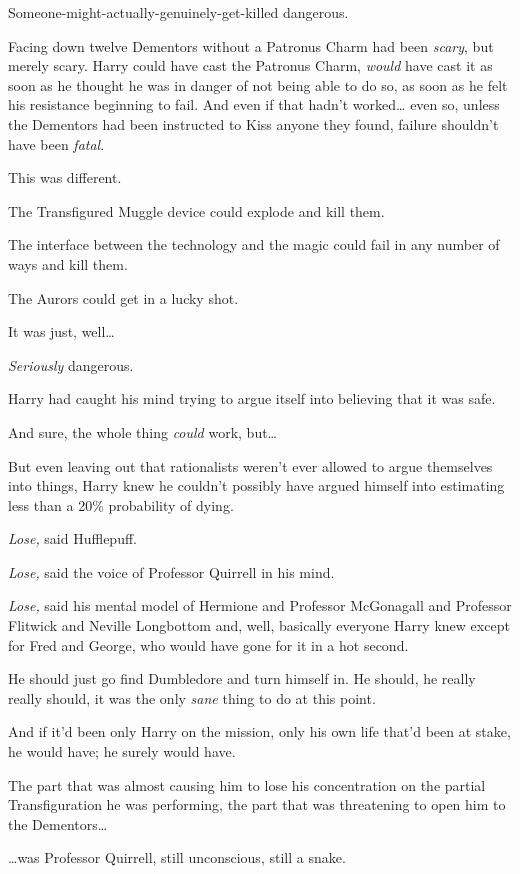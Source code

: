 Someone-might-actually-genuinely-get-killed dangerous.

Facing down twelve Dementors without a Patronus Charm had been \emph{scary}, but merely scary. Harry could have cast the Patronus Charm, \emph{would} have cast it as soon as he thought he was in danger of not being able to do so, as soon as he felt his resistance beginning to fail. And even if that hadn't worked{\ldots} even so, unless the Dementors had been instructed to Kiss anyone they found, failure shouldn't have been \emph{fatal}.

This was different.

The Transfigured Muggle device could explode and kill them.

The interface between the technology and the magic could fail in any number of ways and kill them.

The Aurors could get in a lucky shot.

It was just, well{\ldots}

\emph{Seriously} dangerous.

Harry had caught his mind trying to argue itself into believing that it was safe.

And sure, the whole thing \emph{could} work, but{\ldots}

But even leaving out that rationalists weren't ever allowed to argue themselves into things, Harry knew he couldn't possibly have argued himself into estimating less than a 20\% probability of dying.

\emph{Lose,} said Hufflepuff.

\emph{Lose,} said the voice of Professor Quirrell in his mind.

\emph{Lose,} said his mental model of Hermione and Professor McGonagall and Professor Flitwick and Neville Longbottom and, well, basically everyone Harry knew except for Fred and George, who would have gone for it in a hot second.

He should just go find Dumbledore and turn himself in. He should, he really really should, it was the only \emph{sane} thing to do at this point.

And if it'd been only Harry on the mission, only his own life that'd been at stake, he would have; he surely would have.

The part that was almost causing him to lose his concentration on the partial Transfiguration he was performing, the part that was threatening to open him to the Dementors{\ldots}

{\ldots}was Professor Quirrell, still unconscious, still a snake.

